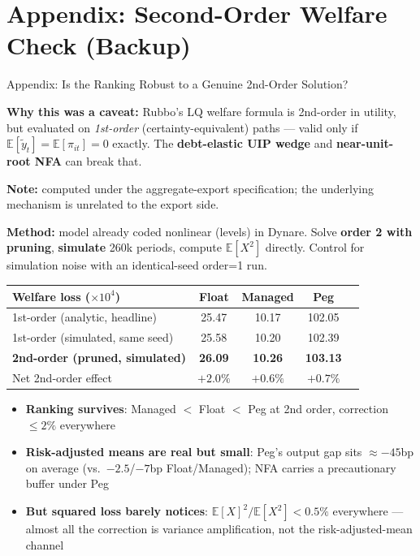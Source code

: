 \section*{Appendix: Second-Order Welfare Check (Backup)}
\begin{frame}{Appendix: Is the Ranking Robust to a Genuine 2nd-Order Solution?}

{\scriptsize \textbf{Why this was a caveat:} Rubbo's LQ welfare formula is 2nd-order in utility, but evaluated on \emph{1st-order} (certainty-equivalent) paths --- valid only if $\mathbb{E}[\tilde y_t]=\mathbb{E}[\pi_{it}]=0$ exactly. The \textbf{debt-elastic UIP wedge} and \textbf{near-unit-root NFA} can break that.}

{\tiny \textbf{Note:} computed under the aggregate-export specification; the underlying mechanism is unrelated to the export side.}

{\scriptsize \textbf{Method:} model already coded nonlinear (levels) in Dynare. Solve \textbf{order 2 with pruning}, \textbf{simulate} 260k periods, compute $\mathbb{E}[X^2]$ directly. Control for simulation noise with an identical-seed order=1 run.}

\vspace{3pt}
\begin{center}
{\scriptsize
\begin{tabular}{lcccc}
\toprule
\textbf{Welfare loss ($\times10^4$)} & \textbf{Float} & \textbf{Managed} & \textbf{Peg} \\
\midrule
1st-order (analytic, headline) & 25.47 & 10.17 & 102.05 \\
1st-order (simulated, same seed) & 25.58 & 10.20 & 102.39 \\
\textbf{2nd-order (pruned, simulated)} & \textbf{26.09} & \textbf{10.26} & \textbf{103.13} \\
\midrule
Net 2nd-order effect & $+2.0\%$ & $+0.6\%$ & $+0.7\%$ \\
\bottomrule
\end{tabular}}
\end{center}

{\scriptsize
\begin{itemize}\setlength{\itemsep}{1pt}\setlength{\topsep}{2pt}
\item \textbf{Ranking survives}: Managed $<$ Float $<$ Peg at 2nd order, correction $\le2\%$ everywhere
\item \textbf{Risk-adjusted means are real but small}: Peg's output gap sits $\approx-45$bp on average (vs.\ $-2.5$/$-7$bp Float/Managed); NFA carries a precautionary buffer under Peg
\item \textbf{But squared loss barely notices}: $\mathbb{E}[X]^2/\mathbb{E}[X^2]<0.5\%$ everywhere --- almost all the correction is variance amplification, not the risk-adjusted-mean channel
\end{itemize}}

\end{frame}

